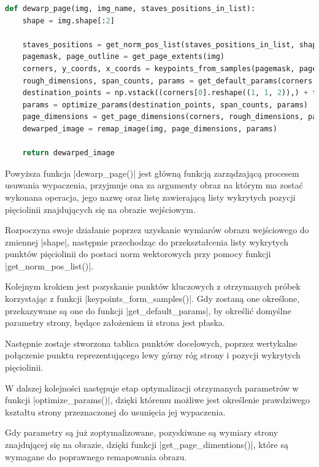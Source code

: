 \begin{lstlisting}[caption={\pyth|dewarp_page()| - główna funkcja usuwania wypaczania obrazu}, label={dewarp-page}, language=Python]
def dewarp_page(img, img_name, staves_positions_in_list):
	shape = img.shape[:2]
	
	staves_positions = get_norm_pos_list(staves_positions_in_list, shape)
	pagemask, page_outline = get_page_extents(img)
	corners, y_coords, x_coords = keypoints_from_samples(pagemask, page_outline, staves_positions)
	rough_dimensions, span_counts, params = get_default_params(corners, y_coords, x_coords)
	destination_points = np.vstack((corners[0].reshape((1, 1, 2)),) + tuple(staves_positions))
	params = optimize_params(destination_points, span_counts, params)
	page_dimensions = get_page_dimensions(corners, rough_dimensions, params)
	dewarped_image = remap_image(img, page_dimensions, params)
	
	return dewarped_image
\end{lstlisting}

Powyższa funkcja \pyth|dewarp_page()| jest główną funkcją zarządzającą procesem usuwania wypaczenia, przyjmuje ona za argumenty obraz na którym ma zostać wykonana operacja, jego nazwę oraz listę zawierającą listy wykrytych pozycji pięciolinii znajdujących się na obrazie wejściowym.

Rozpoczyna swoje działanie poprzez uzyskanie wymiarów obrazu wejściowego do zmiennej \pyth|shape|, następnie przechodząc do przekształcenia listy wykrytych punktów pięciolinii do postaci norm wektorowych przy pomocy funkcji \pyth|get_norm_pos_list()|.

Kolejnym krokiem jest pozyskanie punktów kluczowych z otrzymanych próbek korzystając z funkcji \pyth|keypoints_form_samples()|. Gdy zostaną one określone, przekazywane są one do funkcji \pyth|get_default_params|, by określić domyślne parametry strony, będące założeniem iż strona jest płaska.

Następnie zostaje stworzona tablica punktów docelowych, poprzez wertykalne połączenie punktu reprezentującego lewy górny róg strony i pozycji wykrytych pięciolinii.

W dalszej kolejności następuje etap optymalizacji otrzymanych parametrów w funkcji \pyth|optimize_params()|, dzięki któremu możliwe jest określenie prawdziwego kształtu strony przeznaczonej do usunięcia jej wypaczenia.

Gdy parametry są już zoptymalizowane, pozyskiwane są wymiary strony znajdującej się na obrazie, dzięki funkcji \pyth|get_page_dimentions()|, które są wymagane do poprawnego remapowania obrazu.

